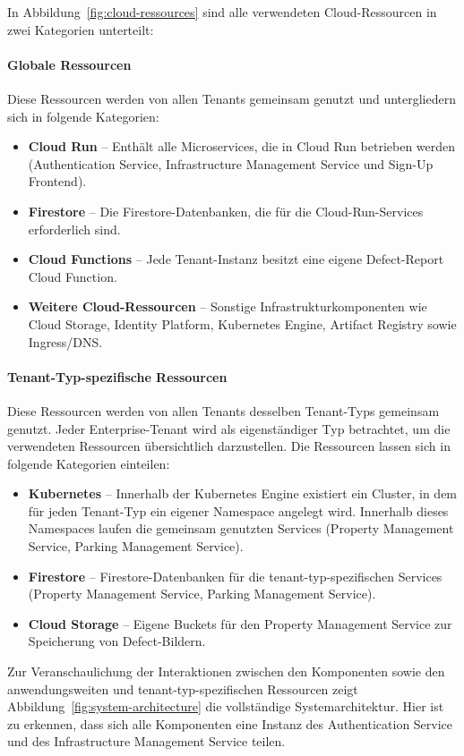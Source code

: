 In Abbildung~\ref{fig:cloud-ressources} sind alle verwendeten Cloud-Ressourcen in zwei Kategorien unterteilt:
\paragraph{Globale Ressourcen}
Diese Ressourcen werden von allen Tenants gemeinsam genutzt und untergliedern sich in folgende Kategorien:
\begin{itemize}
	\item \textbf{Cloud Run} – Enthält alle Microservices, die in Cloud Run betrieben werden (Authentication Service, Infrastructure Management Service und Sign-Up Frontend).
	\item \textbf{Firestore} – Die Firestore-Datenbanken, die für die Cloud-Run-Services erforderlich sind.
	\item \textbf{Cloud Functions} – Jede Tenant-Instanz besitzt eine eigene Defect-Report Cloud Function.
	\item \textbf{Weitere Cloud-Ressourcen} – Sonstige Infrastrukturkomponenten wie Cloud Storage, Identity Platform, Kubernetes Engine, Artifact Registry sowie Ingress/DNS.
\end{itemize}

\paragraph{Tenant-Typ-spezifische Ressourcen}
Diese Ressourcen werden von allen Tenants desselben Tenant-Typs gemeinsam genutzt. Jeder Enterprise-Tenant wird als eigenständiger Typ betrachtet, um die verwendeten Ressourcen übersichtlich darzustellen. Die Ressourcen lassen sich in folgende Kategorien einteilen:
\begin{itemize}
	\item \textbf{Kubernetes} – Innerhalb der Kubernetes Engine existiert ein Cluster, in dem für jeden Tenant-Typ ein eigener Namespace angelegt wird. Innerhalb dieses Namespaces laufen die gemeinsam genutzten Services (Property Management Service, Parking Management Service).
	\item \textbf{Firestore} – Firestore-Datenbanken für die tenant-typ-spezifischen Services (Property Management Service, Parking Management Service).
	\item \textbf{Cloud Storage} – Eigene Buckets für den Property Management Service zur Speicherung von Defect-Bildern.
\end{itemize}

Zur Veranschaulichung der Interaktionen zwischen den Komponenten sowie den anwendungsweiten und tenant-typ-spezifischen Ressourcen zeigt Abbildung~\ref{fig:system-architecture} die vollständige Systemarchitektur. Hier ist zu erkennen, dass sich alle Komponenten eine Instanz des Authentication Service und des Infrastructure Management Service teilen.

